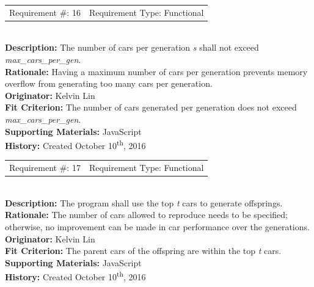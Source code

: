 \documentclass[12pt, titlepage]{article}
\begin{document}
\begin{reqbox}
%
\begin{tabular}{cc}
Requirement \#: 16 & Requirement Type: Functional \\
\end{tabular} \\
%
\textbf{Description:} The number of cars per generation \textit{s} shall not 
exceed \textit{max\_cars\_per\_gen}. \\
\textbf{Rationale:} Having a maximum number of cars per generation prevents 
memory overflow from generating too many cars per generation.\\
\textbf{Originator:} Kelvin Lin\\
\textbf{Fit Criterion:} The number of cars generated per generation does not 
exceed \textit{max\_cars\_per\_gen}.\\
%  
\textbf{Supporting Materials:} JavaScript \\
\textbf{History:} Created October 10\textsuperscript{th}, 2016
%
\end{reqbox}

\newpage

\begin{reqbox}
%
\begin{tabular}{cc}
Requirement \#: 17 & Requirement Type: Functional \\
\end{tabular} \\
%
\textbf{Description:} The program shall use the top \textit{t} cars to generate 
offsprings. \\
\textbf{Rationale:} The number of cars allowed to reproduce needs to be 
specified; otherwise, no improvement can be made in car performance over the 
generations. \\
\textbf{Originator:} Kelvin Lin\\
\textbf{Fit Criterion:} The parent cars of the offspring are within the top 
\textit{t} cars.\\
%  
\textbf{Supporting Materials:} JavaScript \\
\textbf{History:} Created October 10\textsuperscript{th}, 2016
%
\end{reqbox}
\end{document}
